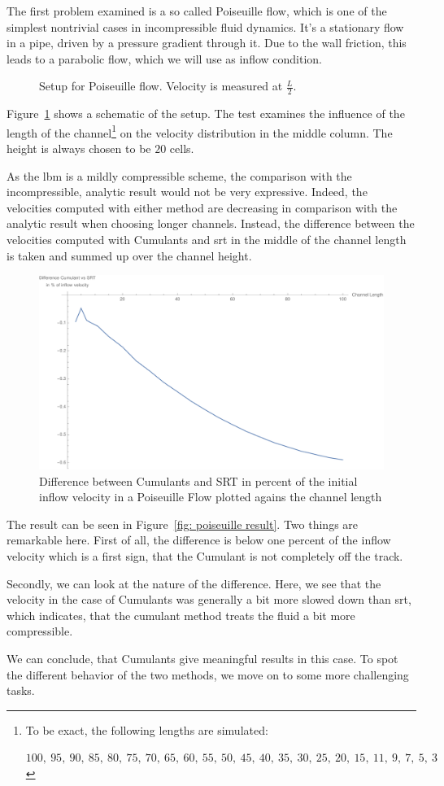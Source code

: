 The first problem examined is a so called Poiseuille flow, which is one of the simplest nontrivial cases in incompressible fluid dynamics.
It's a stationary flow in a pipe, driven by a pressure gradient through it.
Due to the wall friction, this leads to a parabolic flow, which we will use as inflow condition.

\begin{figure}[h!]
  \centering
  
  \caption{Setup for Poiseuille flow. Velocity is measured at $\frac{L}{2}$.}
\label{fig: poiseuille}
\end{figure}

Figure~\ref{fig: poiseuille} shows a schematic of the setup.
The test examines the influence of the length of the channel\footnote{To be exact, the following lengths are simulated:\par
 $100,\ 95,\ 90,\ 85,\ 80,\ 75,\ 70,\ 65,\ 60,\ 55,\ 50,\ 45,\ 40,\ 35,\ 30,\ 25,\ 20,\ 15,\ 11,\ 9,\ 7,\ 5,\ 3$
} on the velocity distribution in the middle column.
The height is always chosen to be $20$ cells.

As the \gls{lbm} is a mildly compressible scheme, the comparison with the incompressible, analytic result would not be very expressive.
Indeed, the velocities computed with either method are decreasing in comparison with the analytic result when choosing longer channels.
Instead, the difference between the velocities computed with Cumulants and \gls{srt} in the middle of the channel length is taken and summed up over the channel height.

\begin{figure}
  \centering
  \includegraphics[width=0.8\linewidth]{../figures/poiseuille.pdf} %
  \caption{Difference between Cumulants and SRT in percent of the initial inflow velocity in a Poiseuille Flow plotted agains the channel length}
\label{fig: poiseuille result}
\end{figure}

The result can be seen in Figure~\eqref{fig: poiseuille result}.
Two things are remarkable here.
First of all, the difference is below one percent of the inflow velocity which is a first sign, that the Cumulant is not completely off the track.

Secondly, we can look at the nature of the difference.
Here, we see that the velocity in the case of Cumulants was generally a bit more slowed down than \gls{srt}, which indicates, that the cumulant method treats the fluid a bit more compressible.

We can conclude, that Cumulants give meaningful results in this case.
To spot the different behavior of the two methods, we move on to some more challenging tasks.
